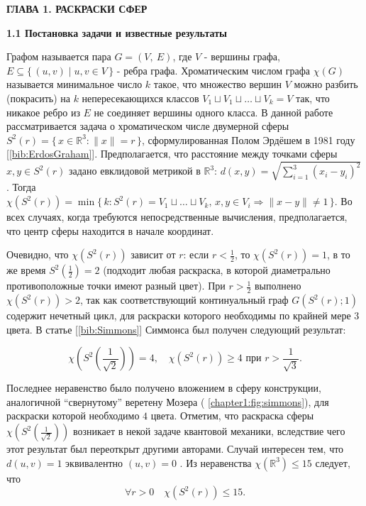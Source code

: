 \newpage
\begin{center}
\noindent\textbf{ГЛАВА 1. РАСКРАСКИ СФЕР}\label{chapters:1}
\vspace{1.5mm}
\end{center}

\vspace{5pt}
\textbf{1.1 Постановка задачи и известные результаты}\label{chapters:1.1}
\vspace{5pt}

Графом называется пара $G=(V,~E)$, где $V$ - вершины графа, $E \subseteq \{\, (u,v) \mid u,v \in V \,\}$ - ребра графа. 
Хроматическим числом графа $\chi(G)$ называется минимальное число $k$ такое, что множество вершин $V$ можно разбить (покрасить) на $k$ 
непересекающихся классов $V_1 \sqcup V_1 \sqcup \dots \sqcup V_k = V$ так, что никакое ребро из $E$ не соединяет вершины одного класса. 
В данной работе рассматривается задача о хроматическом числе двумерной сферы 
$S^2(r) = \{\, x \in \mathbb{R}^3 : \|x\| = r \,\}$, сформулированная Полом Эрдёшем в 1981 году [\ref{bib:ErdosGraham}].
Предполагается, что расстояние между точками сферы $x,y \in S^2(r)$ задано евклидовой метрикой в $\mathbb{R}^3$: 
$d(x,y) = \sqrt{\sum_{i=1}^{3}(x_i-y_i)^2}$. Тогда 
$\chi(S^2(r)) = \min \{\, k: S^2(r) = V_1 \sqcup \dots \sqcup V_k , \, x,y \in V_i \Rightarrow \|x - y\| \ne 1 \,\}$. 
Во всех случаях, когда требуются непосредственные вычисления, предполагается, что центр сферы находится в начале координат.

Очевидно, что $\chi(S^2(r))$ зависит от $r$: если $r < \tfrac{1}{2}$, то $\chi(S^2(r))=1$, в то же время 
$S^2\left(\tfrac{1}{2}\right) = 2$ (подходит любая раскраска, в которой диаметрально противоположные точки имеют разный цвет).
При $r > \tfrac{1}{2}$ выполнено $\chi(S^2(r))>2$, так как соответствующий континуальный граф $G(S^2(r); 1)$ содержит нечетный цикл, для раскраски которого необходимы по крайней мере $3$ цвета.
В статье [\ref{bib:Simmons}] Симмонса был получен следующий результат:

\begin{theorem1}[Симмонс, 1976]
$$ \chi\left(S^2\left(\frac{1}{\sqrt{2}}\right)\right)=4, \quad \chi(S^2(r)) \geq 4 \text{ при } r > \frac{1}{\sqrt{3}}. $$
\end{theorem1}

Последнее неравенство было получено вложением в сферу конструкции, аналогичной \enquote{свернутому} веретену Мозера (\figurename{ \ref{chapter1:fig:simmons}}), для раскраски которой необходимо $4$ цвета. 
Отметим, что раскраска сферы $\chi\left(S^2\left(\frac{1}{\sqrt{2}}\right)\right)$ возникает в некой задаче квантовой механики, вследствие чего этот результат был переоткрыт другими авторами. Случай интересен тем, что $d(u,v)=1$ эквивалентно $(u,v)=0$ .
Из неравенства $\chi(\mathbb{R}^3) \leq 15$ следует, что 
$$\forall r>0 \quad \chi(S^2(r)) \leq 15.$$

